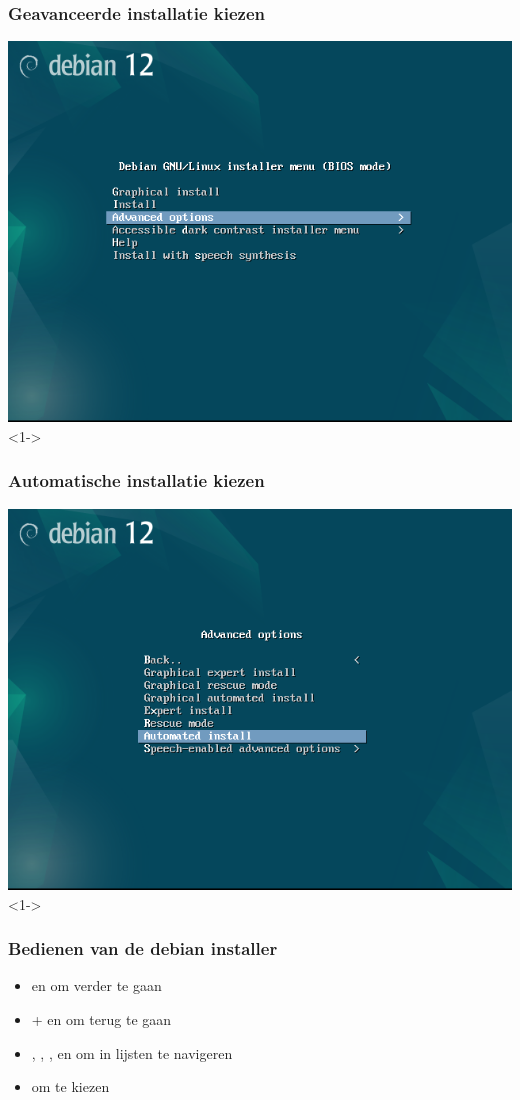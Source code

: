 \documentclass{beamer}
\begin{document}
\begin{frame}
  \frametitle{Geavanceerde installatie kiezen}
  \centering
  \includegraphics[width=\textwidth]{img/advanced-options.png}<1->
\end{frame}

\begin{frame}
  \frametitle{Automatische installatie kiezen}
  \centering
  \includegraphics[width=\textwidth]{img/automated-install.png}<1->
\end{frame}

\begin{frame}
   \frametitle{Bedienen van de debian installer}
   \begin{itemize}
      \item \Tab{} en \RArrow{} om verder te gaan
      \item \Shift{}+\Tab{} en \LArrow{} om terug te gaan
      \item \UArrow{}, \DArrow{}, \PgUp{}, en \PgDown om in lijsten te navigeren
      \item \Enter om te kiezen
   \end{itemize}
\end{frame}
\end{document}
